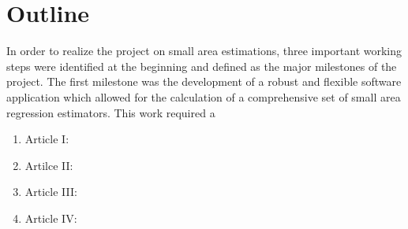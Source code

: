 \newpage
\section{Outline}
\label{sec:intro:outline}

In order to realize the project on small area estimations, three important working steps were identified at the beginning and defined as the major milestones of the project. The first milestone was the development of a robust and flexible software application which allowed for the calculation of a comprehensive set of small area regression estimators. This work required a 



% 
















\begin{enumerate}
	\item Article I:
	\item Artilce II:
	\item Article III:
	\item Article IV:
\end{enumerate}


